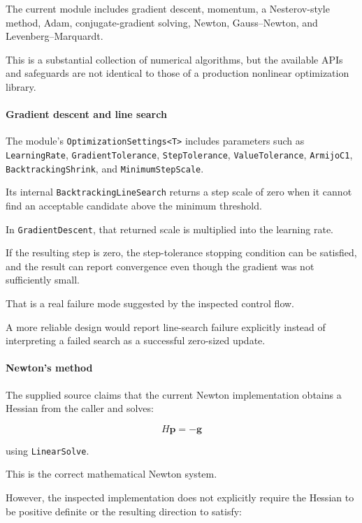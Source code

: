 The current module includes gradient descent, momentum, a Nesterov-style method, Adam, conjugate-gradient solving, Newton, Gauss--Newton, and Levenberg--Marquardt.

This is a substantial collection of numerical algorithms, but the available APIs and safeguards are not identical to those of a production nonlinear optimization library.

\paragraph{Gradient descent and line search}\label{02-foundations-ii-ch028-gradient-descent-and-line-search}

The module's \texttt{OptimizationSettings\textless{}T\textgreater{}} includes parameters such as \texttt{LearningRate}, \texttt{GradientTolerance}, \texttt{StepTolerance}, \texttt{ValueTolerance}, \texttt{ArmijoC1}, \texttt{BacktrackingShrink}, and \texttt{MinimumStepScale}.

Its internal \texttt{BacktrackingLineSearch} returns a step scale of zero when it cannot find an acceptable candidate above the minimum threshold.

In \texttt{GradientDescent}, that returned scale is multiplied into the learning rate.

If the resulting step is zero, the step-tolerance stopping condition can be satisfied, and the result can report convergence even though the gradient was not sufficiently small.

That is a real failure mode suggested by the inspected control flow.

A more reliable design would report line-search failure explicitly instead of interpreting a failed search as a successful zero-sized update.

\paragraph{Newton's method}\label{02-foundations-ii-ch028-newtons-method}

The supplied source claims that the current Newton implementation obtains a Hessian from the caller and solves:

\[
H\mathbf p=-\mathbf g
\]

using \texttt{LinearSolve}.

This is the correct mathematical Newton system.

However, the inspected implementation does not explicitly require the Hessian to be positive definite or the resulting direction to satisfy:

